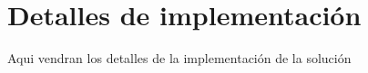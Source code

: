 \chapter{Detalles de implementación}

Aqui vendran los detalles de la implementación de la solución
